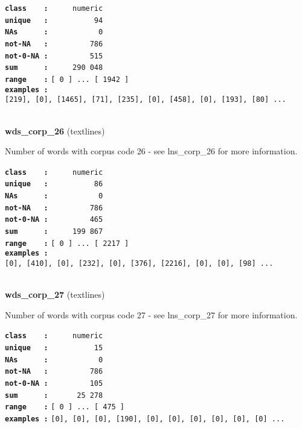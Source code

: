\documentclass[]{article}
\begin{document}
\textbf{\texttt{class\ \ \ \ :}} \texttt{~~~~~numeric}\\
\textbf{\texttt{unique\ \ \ :}} \texttt{~~~~~~~~~~94}\\
\textbf{\texttt{NAs\ \ \ \ \ \ :}} \texttt{~~~~~~~~~~~0}\\
\textbf{\texttt{not-NA\ \ \ :}} \texttt{~~~~~~~~~786}\\
\textbf{\texttt{not-0-NA\ :}} \texttt{~~~~~~~~~515}\\
\textbf{\texttt{sum\ \ \ \ \ \ :}} \texttt{~~~~~290~048}\\
\textbf{\texttt{range\ \ \ \ :}}
\texttt{{[}\ 0\ {]}\ ...\ {[}\ 1942\ {]}}\\
\textbf{\texttt{examples\ :}}
\texttt{{[}219{]},\ {[}0{]},\ {[}1465{]},\ {[}71{]},\ {[}235{]},\ {[}0{]},\ {[}458{]},\ {[}0{]},\ {[}193{]},\ {[}80{]}\ ...}\\

~

\textbf{wds\_corp\_26} (textlines)

Number of words with corpus code 26 - see lns\_corp\_26 for more
information.

\textbf{\texttt{class\ \ \ \ :}} \texttt{~~~~~numeric}\\
\textbf{\texttt{unique\ \ \ :}} \texttt{~~~~~~~~~~86}\\
\textbf{\texttt{NAs\ \ \ \ \ \ :}} \texttt{~~~~~~~~~~~0}\\
\textbf{\texttt{not-NA\ \ \ :}} \texttt{~~~~~~~~~786}\\
\textbf{\texttt{not-0-NA\ :}} \texttt{~~~~~~~~~465}\\
\textbf{\texttt{sum\ \ \ \ \ \ :}} \texttt{~~~~~199~867}\\
\textbf{\texttt{range\ \ \ \ :}}
\texttt{{[}\ 0\ {]}\ ...\ {[}\ 2217\ {]}}\\
\textbf{\texttt{examples\ :}}
\texttt{{[}0{]},\ {[}410{]},\ {[}0{]},\ {[}232{]},\ {[}0{]},\ {[}376{]},\ {[}2216{]},\ {[}0{]},\ {[}0{]},\ {[}98{]}\ ...}\\

~

\textbf{wds\_corp\_27} (textlines)

Number of words with corpus code 27 - see lns\_corp\_27 for more
information.

\textbf{\texttt{class\ \ \ \ :}} \texttt{~~~~~numeric}\\
\textbf{\texttt{unique\ \ \ :}} \texttt{~~~~~~~~~~15}\\
\textbf{\texttt{NAs\ \ \ \ \ \ :}} \texttt{~~~~~~~~~~~0}\\
\textbf{\texttt{not-NA\ \ \ :}} \texttt{~~~~~~~~~786}\\
\textbf{\texttt{not-0-NA\ :}} \texttt{~~~~~~~~~105}\\
\textbf{\texttt{sum\ \ \ \ \ \ :}} \texttt{~~~~~~25~278}\\
\textbf{\texttt{range\ \ \ \ :}}
\texttt{{[}\ 0\ {]}\ ...\ {[}\ 475\ {]}}\\
\textbf{\texttt{examples\ :}}
\texttt{{[}0{]},\ {[}0{]},\ {[}0{]},\ {[}190{]},\ {[}0{]},\ {[}0{]},\ {[}0{]},\ {[}0{]},\ {[}0{]},\ {[}0{]}\ ...}\\
\end{document}
